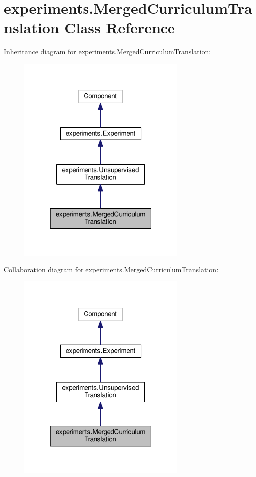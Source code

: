 \hypertarget{classexperiments_1_1MergedCurriculumTranslation}{}\section{experiments.\+Merged\+Curriculum\+Translation Class Reference}
\label{classexperiments_1_1MergedCurriculumTranslation}


Inheritance diagram for experiments.\+Merged\+Curriculum\+Translation\+:
\nopagebreak
\begin{figure}[H]
\begin{center}
\leavevmode
\includegraphics[width=232pt]{classexperiments_1_1MergedCurriculumTranslation__inherit__graph}
\end{center}
\end{figure}


Collaboration diagram for experiments.\+Merged\+Curriculum\+Translation\+:
\nopagebreak
\begin{figure}[H]
\begin{center}
\leavevmode
\includegraphics[width=232pt]{classexperiments_1_1MergedCurriculumTranslation__coll__graph}
\end{center}
\end{figure}
